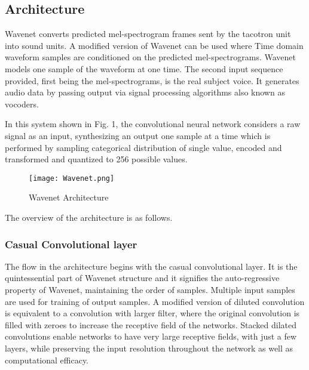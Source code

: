\documentclass[runningheads]{llncs}
\begin{document}
\subsection{Architecture}
Wavenet converts predicted  mel-spectrogram frames sent by the tacotron unit  into sound units. A modified version of Wavenet can be used where Time domain waveform samples are conditioned on the predicted mel-spectrograms.  Wavenet models one sample of the waveform at one time. The second input sequence provided, first being the mel-spectrograms, is the real subject voice. It generates audio data by passing output via signal processing algorithms also known as vocoders.


In this system shown in Fig. 1, the convolutional neural network considers a raw signal as an input, synthesizing an output one sample at a time which is performed by sampling categorical distribution of single value, encoded and transformed and quantized to 256 possible values. 



\begin{figure}[htbp]
\centerline{\texttt{[image: Wavenet.png]}}
\caption{Wavenet Architecture \cite{ref_paper2}}
\end{figure}

The overview of the architecture is as follows.

\subsubsection{Casual Convolutional layer}
The flow in the architecture begins with the casual convolutional layer. It is the quintessential part of Wavenet structure and it signifies the auto-regressive property of Wavenet, maintaining the order of samples.  Multiple input samples are used for training of output samples. A modified version of diluted convolution is equivalent to a convolution with larger filter, where the original convolution is filled with zeroes to increase the receptive field of the networks. Stacked dilated convolutions enable networks to have very large receptive fields,  with just a few layers, while preserving the input resolution throughout the network as well as computational efficacy.
\end{document}
